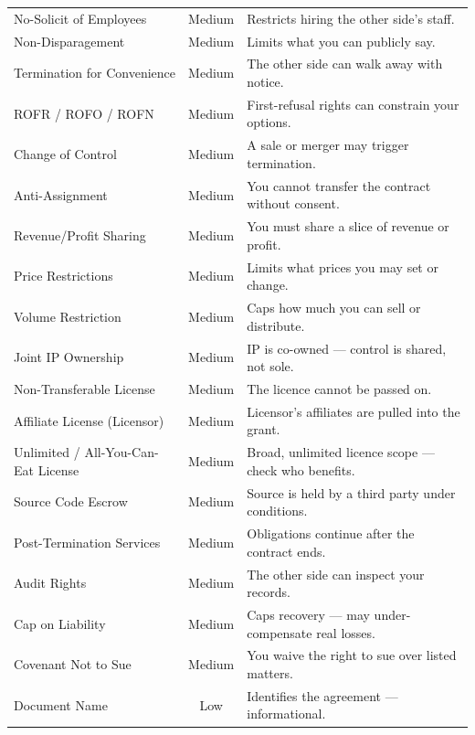 \begin{longtable}{p{4.6cm} c p{7.6cm}}
No-Solicit of Employees & \textcolor{riskmed}{Medium} & Restricts hiring the other side's staff.\\
Non-Disparagement & \textcolor{riskmed}{Medium} & Limits what you can publicly say.\\
Termination for Convenience & \textcolor{riskmed}{Medium} & The other side can walk away with notice.\\
ROFR / ROFO / ROFN & \textcolor{riskmed}{Medium} & First-refusal rights can constrain your options.\\
Change of Control & \textcolor{riskmed}{Medium} & A sale or merger may trigger termination.\\
Anti-Assignment & \textcolor{riskmed}{Medium} & You cannot transfer the contract without consent.\\
Revenue/Profit Sharing & \textcolor{riskmed}{Medium} & You must share a slice of revenue or profit.\\
Price Restrictions & \textcolor{riskmed}{Medium} & Limits what prices you may set or change.\\
Volume Restriction & \textcolor{riskmed}{Medium} & Caps how much you can sell or distribute.\\
Joint IP Ownership & \textcolor{riskmed}{Medium} & IP is co-owned --- control is shared, not sole.\\
Non-Transferable License & \textcolor{riskmed}{Medium} & The licence cannot be passed on.\\
Affiliate License (Licensor) & \textcolor{riskmed}{Medium} & Licensor's affiliates are pulled into the grant.\\
Unlimited / All-You-Can-Eat License & \textcolor{riskmed}{Medium} & Broad, unlimited licence scope --- check who benefits.\\
Source Code Escrow & \textcolor{riskmed}{Medium} & Source is held by a third party under conditions.\\
Post-Termination Services & \textcolor{riskmed}{Medium} & Obligations continue after the contract ends.\\
Audit Rights & \textcolor{riskmed}{Medium} & The other side can inspect your records.\\
Cap on Liability & \textcolor{riskmed}{Medium} & Caps recovery --- may under-compensate real losses.\\
Covenant Not to Sue & \textcolor{riskmed}{Medium} & You waive the right to sue over listed matters.\\
\midrule
Document Name & \textcolor{risklow}{Low} & Identifies the agreement --- informational.\\

\end{longtable}

